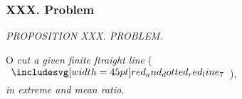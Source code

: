 \documentclass[12pt,preview]{standalone}
\begin{document}
\null\removelastskip\nointerlineskip\vspace*{-\baselineskip}

\subsubsection{XXX. Problem}

\begin{minipage}[t]{0.33\textwidth}
    \vspace{40pt}
    
\end{minipage}%
\hfill
\begin{minipage}[t]{0.64\textwidth}
    \vspace{0pt}

    \begin{center}
        \textit{PROPOSITION XXX. PROBLEM.}\label{book6pr30} \\
    \end{center}

    \hfill

    \begin{center}
        \raggedright \lettrine[lines=4, loversize=1, nindent=0pt]{}{}O \textit{cut a given finite ſtraight line} (\hspace{-1ex}$\bimg{red_and_dotted_red_line_7}$\hspace{-1ex}),\\ \textit{in extreme and mean ratio}.
    \end{center}

    \hfill

    \hfill

    \hfill


\end{minipage}
\end{document}
